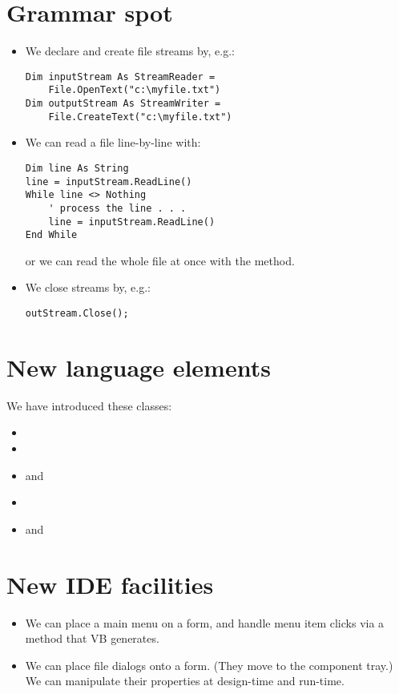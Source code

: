	\section{Grammar spot}
		\begin{itemize}
      \item We declare and create file streams by, e.g.:
				\begin{lstlisting}
Dim inputStream As StreamReader =
	File.OpenText("c:\myfile.txt")
Dim outputStream As StreamWriter =
	File.CreateText("c:\myfile.txt")
				\end{lstlisting}
      \item We can read a file line-by-line with:
				\begin{lstlisting}
Dim line As String
line = inputStream.ReadLine()
While line <> Nothing
	' process the line . . .
	line = inputStream.ReadLine()
End While
		\end{lstlisting}
				or we can read the whole file at once with the  method.
      \item We close streams by, e.g.:
				\begin{lstlisting}
outStream.Close();
				\end{lstlisting}
		\end{itemize}


	\section{New language elements}
		We have introduced these classes:
		\begin{itemize}
			\item {}
      \item {}
      \item {} and 
      \item {}
      \item {} and 
		\end{itemize}


	\section{New IDE facilities}
		\begin{itemize}
      \item We can place a main menu on a form, and handle menu item clicks via a method that VB generates.
      \item We can place file dialogs onto a form. (They move to the component tray.) We can manipulate their properties at design-time and run-time.
		\end{itemize}


